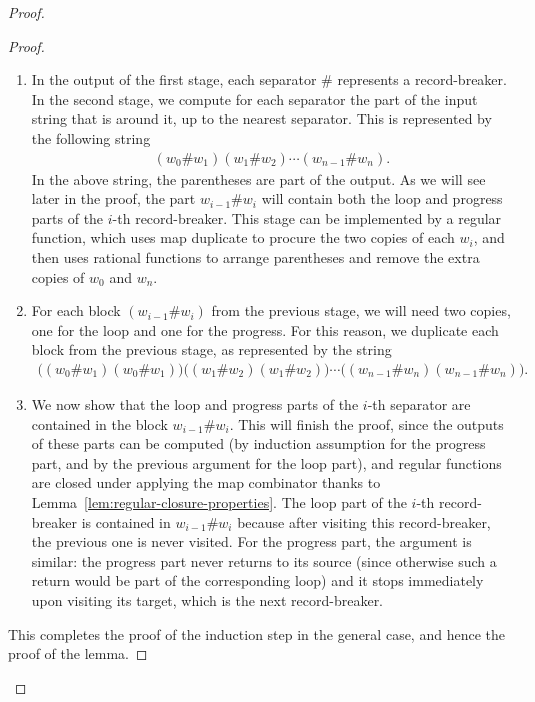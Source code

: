 \begin{proof}
\begin{proof}
\begin{enumerate}
        \item         In the output of the first stage, each separator $\#$ represents a record-breaker. In the second stage, we compute for each separator the part of the input string that is around it, up to the nearest separator. This is represented by  the following string
        \begin{align*}
        (w_0 \# w_1)  (w_1 \# w_2) \cdots (w_{n-1} \# w_n).
        \end{align*}
        In the above string, the parentheses are part of the output.  As we will see later in the proof, the part $w_{i-1}\# w_i$ will contain both the loop and progress parts of the $i$-th record-breaker. This stage can be implemented by a regular function, which uses map duplicate to procure the two copies of each $w_i$, and then uses rational functions to arrange parentheses and remove the extra copies of $w_0$ and $w_n$.  
        \item 
        For each block $(w_{i-1}\# w_i)$ from the previous stage, we will need two copies, one for the loop and one for the progress. For this reason, we duplicate each block from the previous stage, as represented by the string 
             \begin{align*}
        \big((w_0 \# w_1) (w_0 \# w_1)\big)  \big((w_1 \# w_2) (w_1 \# w_2)\big) \cdots \big((w_{n-1} \# w_n) (w_{n-1} \# w_n)\big).
        \end{align*}
        \item We now show that  the loop and progress parts of the $i$-th separator are contained in the block $w_{i-1}\# w_i$. This will finish the proof, since the outputs of these parts can be computed (by induction assumption for the progress part, and by the previous argument for the loop part), and regular functions are closed under applying the map combinator thanks to Lemma~\ref{lem:regular-closure-properties}.  The loop part of the $i$-th record-breaker is contained in $w_{i-1} \# w_i$ because after visiting this record-breaker, the previous one is never visited. For the progress part, the argument is similar: the progress part never returns to its source (since otherwise such a return would be part of the corresponding loop) and it stops immediately upon visiting its target, which is the next record-breaker.
        \end{enumerate}
        This completes the proof of the induction step in the general case, and hence the proof of the lemma.
\end{proof}

\end{proof}


